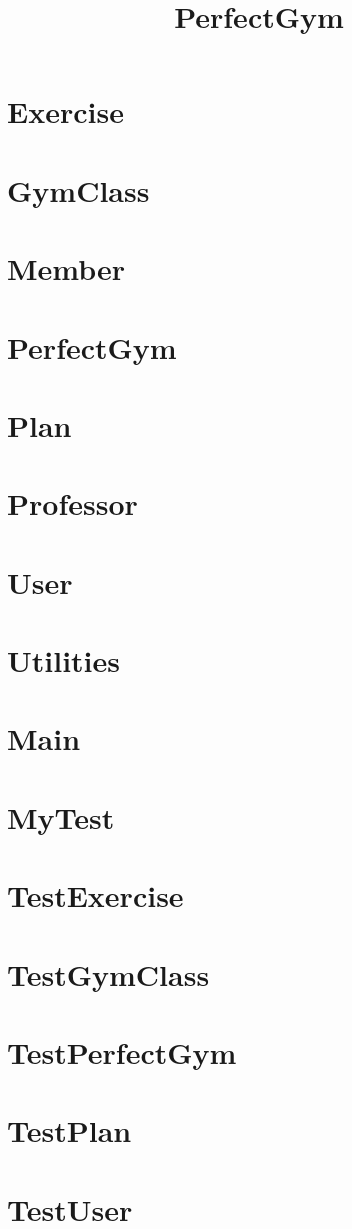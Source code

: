 \documentclass{article}
\begin{document}
\title{PerfectGym}
\author{}
\maketitle
\tableofcontents

\section{Exercise}

\section{GymClass}

\section{Member}

\section{PerfectGym}

\section{Plan}

\section{Professor}

\section{User}

\section{Utilities}

\section{Main}

\section{MyTest}

\section{TestExercise}

\section{TestGymClass}

\section{TestPerfectGym}

\section{TestPlan}

\section{TestUser}

\end{document}
